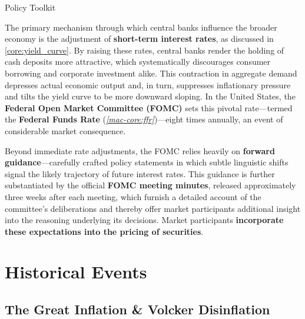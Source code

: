 \documentclass[10pt]{article}
\begin{document}
    \begin{core}{Policy Toolkit}

      The primary mechanism through which central banks influence the broader economy is the adjustment of \textbf{short-term interest rates}, as discussed in \autoref{core:yield_curve}. By raising these rates, central banks render the holding of cash deposits more attractive, which systematically discourages consumer borrowing and corporate investment alike. This contraction in aggregate demand depresses actual economic output and, in turn, suppresses inflationary pressure and tilts the yield curve to be more downward sloping. In the United States, the \textbf{Federal Open Market Committee (FOMC)} sets this pivotal rate---termed the \textbf{Federal Funds Rate} (\textit{\autoref{mac-core:ffr}})---eight times annually, an event of considerable market consequence.


      Beyond immediate rate adjustments, the FOMC relies heavily on \textbf{forward guidance}---carefully crafted policy statements in which subtle linguistic shifts signal the likely trajectory of future interest rates. This guidance is further substantiated by the official \textbf{FOMC meeting minutes}, released approximately three weeks after each meeting, which furnish a detailed account of the committee's deliberations and thereby offer market participants additional insight into the reasoning underlying its decisions. Market participants \textbf{incorporate these expectations into the pricing of securities}.

    \end{core}

\section{Historical Events}

  \subsection{The Great Inflation \& Volcker Disinflation}
\end{document}
